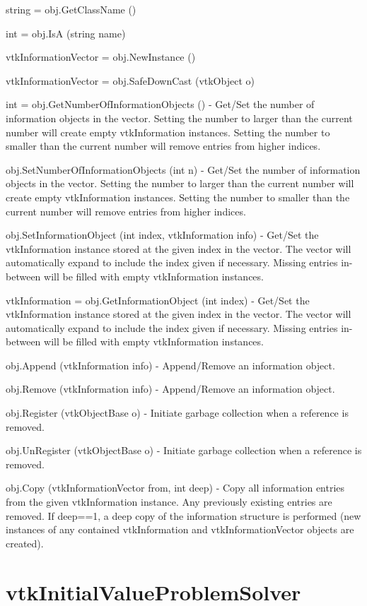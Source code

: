 \begin{DoxyItemize}
\item {\ttfamily string = obj.\-Get\-Class\-Name ()}  
\item {\ttfamily int = obj.\-Is\-A (string name)}  
\item {\ttfamily vtk\-Information\-Vector = obj.\-New\-Instance ()}  
\item {\ttfamily vtk\-Information\-Vector = obj.\-Safe\-Down\-Cast (vtk\-Object o)}  
\item {\ttfamily int = obj.\-Get\-Number\-Of\-Information\-Objects ()} -\/ Get/\-Set the number of information objects in the vector. Setting the number to larger than the current number will create empty vtk\-Information instances. Setting the number to smaller than the current number will remove entries from higher indices.  
\item {\ttfamily obj.\-Set\-Number\-Of\-Information\-Objects (int n)} -\/ Get/\-Set the number of information objects in the vector. Setting the number to larger than the current number will create empty vtk\-Information instances. Setting the number to smaller than the current number will remove entries from higher indices.  
\item {\ttfamily obj.\-Set\-Information\-Object (int index, vtk\-Information info)} -\/ Get/\-Set the vtk\-Information instance stored at the given index in the vector. The vector will automatically expand to include the index given if necessary. Missing entries in-\/between will be filled with empty vtk\-Information instances.  
\item {\ttfamily vtk\-Information = obj.\-Get\-Information\-Object (int index)} -\/ Get/\-Set the vtk\-Information instance stored at the given index in the vector. The vector will automatically expand to include the index given if necessary. Missing entries in-\/between will be filled with empty vtk\-Information instances.  
\item {\ttfamily obj.\-Append (vtk\-Information info)} -\/ Append/\-Remove an information object.  
\item {\ttfamily obj.\-Remove (vtk\-Information info)} -\/ Append/\-Remove an information object.  
\item {\ttfamily obj.\-Register (vtk\-Object\-Base o)} -\/ Initiate garbage collection when a reference is removed.  
\item {\ttfamily obj.\-Un\-Register (vtk\-Object\-Base o)} -\/ Initiate garbage collection when a reference is removed.  
\item {\ttfamily obj.\-Copy (vtk\-Information\-Vector from, int deep)} -\/ Copy all information entries from the given vtk\-Information instance. Any previously existing entries are removed. If deep==1, a deep copy of the information structure is performed (new instances of any contained vtk\-Information and vtk\-Information\-Vector objects are created).  
\end{DoxyItemize}\hypertarget{vtkcommon_vtkinitialvalueproblemsolver}{}\section{vtk\-Initial\-Value\-Problem\-Solver}\label{vtkcommon_vtkinitialvalueproblemsolver}
